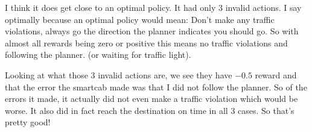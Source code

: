 \documentclass[11pt]{article}
\begin{document}
I think it does get close to an optimal policy. It had only 3 invalid actions. I say optimally because an optimal policy would mean: Don't make any traffic violations, always go the direction the planner indicates you should go. So with almost all rewards being zero or positive this  means no traffic violations and following the planner. (or waiting for traffic light). \par
Looking at what those 3 invalid actions are, we see they have $-0.5$ reward and that the error the smartcab made was that I did not follow the planner. So of the errors it made, it actually did not even make a traffic violation which would be worse. It also did in fact reach the destination on time in all 3 cases. So that's pretty good!
\end{document}
